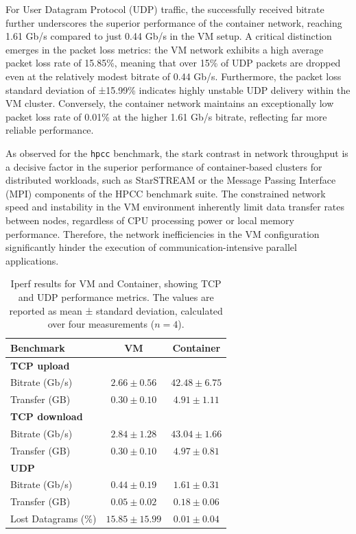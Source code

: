 For User Datagram Protocol (UDP) traffic, the successfully received bitrate further underscores the superior performance of the container network, reaching 1.61 Gb/s compared to just 0.44 Gb/s in the VM setup. A critical distinction emerges in the packet loss metrics: the VM network exhibits a high average packet loss rate of 15.85\%, meaning that over 15\% of UDP packets are dropped even at the relatively modest bitrate of 0.44 Gb/s. Furthermore, the packet loss standard deviation of ±15.99\% indicates highly unstable UDP delivery within the VM cluster. Conversely, the container network maintains an exceptionally low packet loss rate of 0.01\% at the higher 1.61 Gb/s bitrate, reflecting far more reliable performance.

As observed for the \texttt{hpcc} benchmark, the stark contrast in network throughput is a decisive factor in the superior performance of container-based clusters for distributed workloads, such as StarSTREAM or the Message Passing Interface (MPI) components of the HPCC benchmark suite. The constrained network speed and instability in the VM environment inherently limit data transfer rates between nodes, regardless of CPU processing power or local memory performance. Therefore, the network inefficiencies in the VM configuration significantly hinder the execution of communication-intensive parallel applications.
\begin{table}[htbp]
    \centering
    \begin{tabular}{lcc}
    \toprule
    \textbf{Benchmark} & \textbf{VM} & \textbf{Container} \\
    \midrule
    \textbf{TCP upload} & & \\
    Bitrate (Gb/s) & $2.66 \pm 0.56$ & $42.48 \pm 6.75$ \\
    Transfer (GB) & $0.30 \pm 0.10$ & $4.91 \pm 1.11$ \\
    \midrule
    \textbf{TCP download} & & \\
    Bitrate (Gb/s) & $2.84 \pm 1.28$ & $43.04 \pm 1.66$ \\
    Transfer (GB) & $0.30 \pm 0.10$ & $4.97 \pm 0.81$ \\
    \midrule
    \textbf{UDP} & & \\
    Bitrate (Gb/s) & $0.44 \pm 0.19$ & $1.61 \pm 0.31$ \\
    Transfer (GB) & $0.05 \pm 0.02$ & $0.18 \pm 0.06$ \\
    Lost Datagrams (\%) & $15.85 \pm 15.99$ & $0.01 \pm 0.04$ \\
    \bottomrule
    \end{tabular}
    \caption{Iperf results for VM and Container, showing TCP and UDP performance metrics. The values are reported as mean ± standard deviation, calculated over four measurements ($n = 4$).}
    \label{tab:iperf}
\end{table}